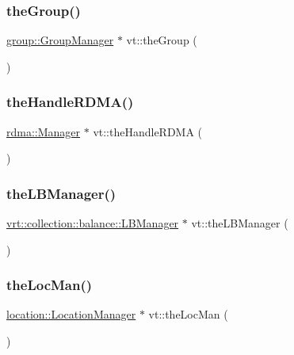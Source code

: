 \mbox{\label{namespacevt_a4548473dce44fb654400009e2b2fe64e}} 
\subsubsection{\texorpdfstring{the\+Group()}{theGroup()}}
{\footnotesize\ttfamily \hyperlink{structvt_1_1group_1_1_group_manager}{group\+::\+Group\+Manager} $\ast$ vt\+::the\+Group (\begin{DoxyParamCaption}{ }\end{DoxyParamCaption})}

\mbox{\label{namespacevt_aecb87ec2c40b5b7fc57ba4cf8ea838b0}} 
\subsubsection{\texorpdfstring{the\+Handle\+R\+D\+M\+A()}{theHandleRDMA()}}
{\footnotesize\ttfamily \hyperlink{structvt_1_1rdma_1_1_manager}{rdma\+::\+Manager} $\ast$ vt\+::the\+Handle\+R\+D\+MA (\begin{DoxyParamCaption}{ }\end{DoxyParamCaption})}

\mbox{\label{namespacevt_a05187076eac8c66c9951b062b0955520}} 
\subsubsection{\texorpdfstring{the\+L\+B\+Manager()}{theLBManager()}}
{\footnotesize\ttfamily \hyperlink{structvt_1_1vrt_1_1collection_1_1balance_1_1_l_b_manager}{vrt\+::collection\+::balance\+::\+L\+B\+Manager} $\ast$ vt\+::the\+L\+B\+Manager (\begin{DoxyParamCaption}{ }\end{DoxyParamCaption})}

\mbox{\label{namespacevt_ace1c9d64e09732e3b7414d02517ecfdb}} 
\subsubsection{\texorpdfstring{the\+Loc\+Man()}{theLocMan()}}
{\footnotesize\ttfamily \hyperlink{structvt_1_1location_1_1_location_manager}{location\+::\+Location\+Manager} $\ast$ vt\+::the\+Loc\+Man (\begin{DoxyParamCaption}{ }\end{DoxyParamCaption})}

